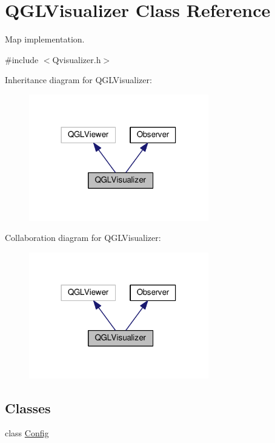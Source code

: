 \hypertarget{classQGLVisualizer}{}\section{Q\+G\+L\+Visualizer Class Reference}
\label{classQGLVisualizer}


Map implementation.  




{\ttfamily \#include $<$Qvisualizer.\+h$>$}



Inheritance diagram for Q\+G\+L\+Visualizer\+:
\nopagebreak
\begin{figure}[H]
\begin{center}
\leavevmode
\includegraphics[width=222pt]{classQGLVisualizer__inherit__graph}
\end{center}
\end{figure}


Collaboration diagram for Q\+G\+L\+Visualizer\+:
\nopagebreak
\begin{figure}[H]
\begin{center}
\leavevmode
\includegraphics[width=222pt]{classQGLVisualizer__coll__graph}
\end{center}
\end{figure}
\subsection*{Classes}
\begin{DoxyCompactItemize}
\item 
class \hyperlink{classQGLVisualizer_1_1Config}{Config}
\end{DoxyCompactItemize}
